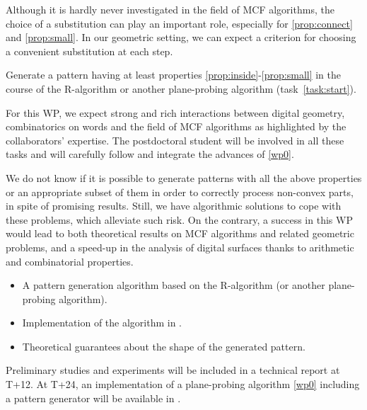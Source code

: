 Although it is hardly never investigated in the field of MCF algorithms, the choice of a
substitution can play an important role, especially for \ref{prop:connect} and \ref{prop:small}.
In our geometric setting, we can expect a criterion for choosing a convenient substitution at each step. 

\begin{Task}
  \label{task:genpat}
  Generate a pattern having at least properties \ref{prop:inside}-\ref{prop:small} in the course of
  the R-algorithm or another plane-probing algorithm (task~\ref{task:start}). 
\end{Task}

For this WP, we expect strong and rich interactions between digital geometry, combinatorics on words
and the field of MCF algorithms as highlighted by the collaborators' expertise. The postdoctoral
student will be involved in all these tasks and will carefully follow and integrate the advances
of \ref{wp0}.


\Risks
We do not know if it is possible to generate patterns with all the above properties
or an appropriate subset of them in order to correctly process non-convex parts,
in spite of promising results. Still, we have algorithmic solutions
\cite{LPRJMIV2017} to cope with these problems, which alleviate such risk. 
On the contrary, a success in this WP would lead to both theoretical results
on MCF algorithms and related geometric problems, and a speed-up in the analysis
of digital surfaces thanks to arithmetic and combinatorial properties.  

\Success
\begin{itemize}
  \item A pattern generation algorithm based on the R-algorithm (or another plane-probing algorithm).
  \item Implementation of the algorithm in \DGtal.
  \item Theoretical guarantees about the shape of the generated pattern. 
\end{itemize}

Preliminary studies and experiments will be included in a technical report at T+12.
At T+24, an implementation of a plane-probing algorithm \ref{wp0} including a pattern
generator will be available in \DGtal. 


